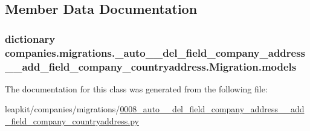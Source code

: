 \subsection{Member Data Documentation}
\hypertarget{classcompanies_1_1migrations_1_10008__auto____del__field__company__address____add__field__company__countryaddress_1_1_migration_a238f1b4ca3b01257cec855d217b0b2bc}{
\subsubsection[{models}]{\setlength{\rightskip}{0pt plus 5cm}dictionary companies.\-migrations.\-\_\-auto\-\_\-\-\_\-del\-\_\-field\-\_\-company\-\_\-address\-\_\-\-\_\-add\-\_\-field\-\_\-company\-\_\-countryaddress.\-Migration.\-models\hspace{0.3cm}{\ttfamily [static]}}}\label{classcompanies_1_1migrations_1_10008__auto____del__field__company__address____add__field__company__countryaddress_1_1_migration_a238f1b4ca3b01257cec855d217b0b2bc}


The documentation for this class was generated from the following file\-:\begin{DoxyCompactItemize}
\item 
leapkit/companies/migrations/\hyperlink{0008__auto____del__field__company__address____add__field__company__countryaddress_8py}{0008\-\_\-auto\-\_\-\-\_\-del\-\_\-field\-\_\-company\-\_\-address\-\_\-\-\_\-add\-\_\-field\-\_\-company\-\_\-countryaddress.\-py}\end{DoxyCompactItemize}
